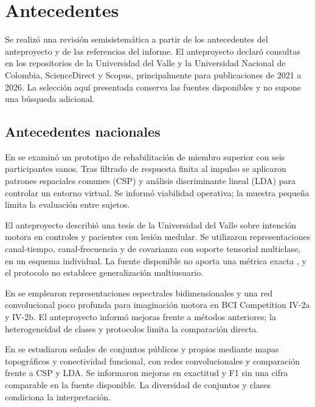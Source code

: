 \section{Antecedentes}
Se realizó una revisión semisistemática a partir de los antecedentes del anteproyecto y de las referencias del informe. El anteproyecto declaró consultas en los repositorios de la Universidad del Valle y la Universidad Nacional de Colombia, ScienceDirect y Scopus, principalmente para publicaciones de 2021 a 2026. La selección aquí presentada conserva las fuentes disponibles y no supone una búsqueda adicional.

\subsection{Antecedentes nacionales}
En \cite{camargo2023prototype} se examinó un prototipo de rehabilitación de miembro superior con seis participantes sanos. Tras filtrado de respuesta finita al impulso se aplicaron patrones espaciales comunes (CSP) y análisis discriminante lineal (LDA) para controlar un entorno virtual. Se informó viabilidad operativa; la muestra pequeña limita la evaluación entre sujetos.

El anteproyecto describió una tesis de la Universidad del Valle sobre intención motora en controles y pacientes con lesión medular. Se utilizaron representaciones canal-tiempo, canal-frecuencia y de covarianza con soporte tensorial multiclase, en un esquema individual. La fuente disponible no aporta una métrica exacta \cite{ferrin2023tesis}, y el protocolo no establece generalización multiusuario.

En \cite{milanes2021shallow} se emplearon representaciones espectrales bidimensionales y una red convolucional poco profunda para imaginación motora en BCI Competition IV-2a y IV-2b. El anteproyecto informó mejoras frente a métodos anteriores; la heterogeneidad de clases y protocolos limita la comparación directa.

En \cite{gomez2023estrategia} se estudiaron señales de conjuntos públicos y propios mediante mapas topográficos y conectividad funcional, con redes convolucionales y comparación frente a CSP y LDA. Se informaron mejoras en exactitud y F1 sin una cifra comparable en la fuente disponible. La diversidad de conjuntos y clases condiciona la interpretación.

